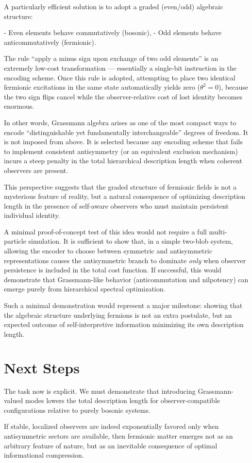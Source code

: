 A particularly efficient solution is to adopt a graded (even/odd) algebraic structure:

- Even elements behave commutatively (bosonic),
- Odd elements behave anticommutatively (fermionic).

The rule ``apply a minus sign upon exchange of two odd elements'' is an extremely low-cost transformation — essentially a single-bit instruction in the encoding scheme. Once this rule is adopted, attempting to place two identical fermionic excitations in the same state automatically yields zero ($\theta^2 = 0$), because the two sign flips cancel while the observer-relative cost of lost identity becomes enormous.

In other words, Grassmann algebra arises as one of the most compact ways to encode ``distinguishable yet fundamentally interchangeable'' degrees of freedom. It is not imposed from above. It is selected because any encoding scheme that fails to implement consistent antisymmetry (or an equivalent exclusion mechanism) incurs a steep penalty in the total hierarchical description length when coherent observers are present.

This perspective suggests that the graded structure of fermionic fields is not a mysterious feature of reality, but a natural consequence of optimizing description length in the presence of self-aware observers who must maintain persistent individual identity.

A minimal proof-of-concept test of this idea would not require a full multi-particle simulation. It is sufficient to show that, in a simple two-blob system, allowing the encoder to choose between symmetric and antisymmetric representations causes the antisymmetric branch to dominate \emph{only} when observer persistence is included in the total cost function. If successful, this would demonstrate that Grassmann-like behavior (anticommutation and nilpotency) can emerge purely from hierarchical spectral optimization.

Such a minimal demonstration would represent a major milestone: showing that the algebraic structure underlying fermions is not an extra postulate, but an expected outcome of self-interpretive information minimizing its own description length.


\section{Next Steps}

The task now is explicit. We must demonstrate that introducing Grassmann-valued modes lowers the total description length for observer-compatible configurations relative to purely bosonic systems.

If stable, localized observers are indeed exponentially favored only when antisymmetric sectors are available, then fermionic matter emerges not as an arbitrary feature of nature, but as an inevitable consequence of optimal informational compression.

